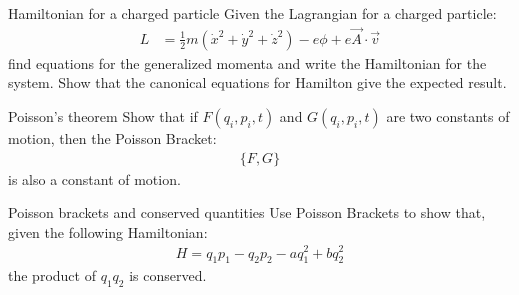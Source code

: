 \begin{problem}{Hamiltonian for a charged particle}
Given the Lagrangian for a charged particle:
\begin{align}
L&=\frac{1}{2}m(\dot{x}^2+\dot{y}^2+\dot{z}^2)-e\phi+e\vec{A}\cdot\vec{v}
\end{align}
find equations for the generalized momenta and write the Hamiltonian for the system. Show that the canonical equations for Hamilton give the expected result.
\label{prob_Hamilton_10}
\end{problem}

\begin{problem}{Poisson's theorem}
Show that if $F(q_i,p_i,t)$ and $G(q_i,p_i,t)$ are two constants of motion, then the Poisson Bracket:
\begin{align*}
\{F,G\}
\end{align*}
is also a constant of motion. 
\label{prob_Hamilton_11}
\end{problem}

\begin{problem}{Poisson brackets and conserved quantities}
Use Poisson Brackets to show that, given the following Hamiltonian:
\begin{align*}
H=q_1p_1-q_2p_2-aq_1^2+bq_2^2
\end{align*}
the product of $q_1q_2$ is conserved. 
\label{prob_Hamilton_12}
\end{problem}